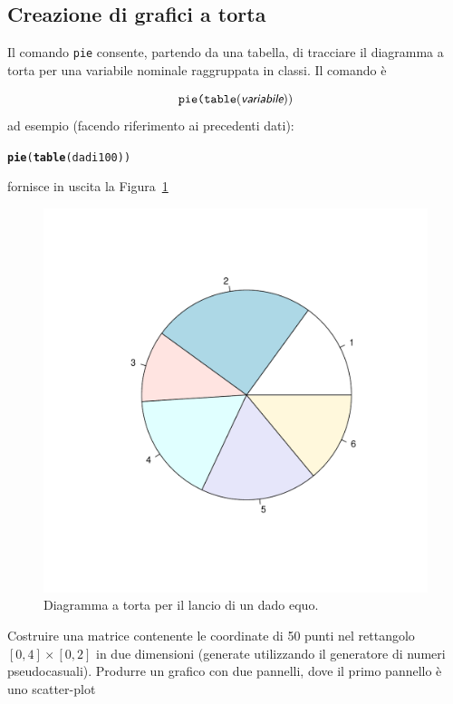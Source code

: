 \documentclass[onecolumn,12pt]{book}\usepackage[]{graphicx}\usepackage[]{color}
\makeatletter
\def\maxwidth{ %
  \ifdim\Gin@nat@width>\linewidth
    \linewidth
  \else
    \Gin@nat@width
  \fi
}
\newcommand{\hlstd}[1]{\textcolor[rgb]{0.345,0.345,0.345}{#1}}%
\newcommand{\hlkwd}[1]{\textcolor[rgb]{0.737,0.353,0.396}{\textbf{#1}}}%
\newenvironment{kframe}{%
 \def\at@end@of@kframe{}%
 \ifinner\ifhmode%
  \def\at@end@of@kframe{\end{minipage}}%
  \begin{minipage}{\columnwidth}%
 \fi\fi%
 \def\FrameCommand##1{\hskip\@totalleftmargin \hskip-\fboxsep
 \colorbox{shadecolor}{##1}\hskip-\fboxsep
     \hskip-\linewidth \hskip-\@totalleftmargin \hskip\columnwidth}%
 \MakeFramed {\advance\hsize-\width
   \@totalleftmargin\z@ \linewidth\hsize
   \@setminipage}}%
 {\par\unskip\endMakeFramed%
 \at@end@of@kframe}
\newenvironment{knitrout}{}{} %
\newcommand{\varia}[1]{\textsl{\textsf{#1}}}
\makeatother
\begin{document}
\subsection{Creazione di grafici a torta}

Il comando \texttt{pie} consente, partendo da una tabella, di tracciare il diagramma a torta per una variabile nominale raggruppata in classi. Il comando \`e

\begin{equation*}\texttt{pie(table}(\varia{variabile} ))
\end{equation*}
ad esempio (facendo riferimento ai precedenti dati):
\begin{knitrout}
\color{fgcolor}\begin{kframe}
\begin{alltt}
\hlkwd{pie}\hlstd{(}\hlkwd{table}\hlstd{(dadi100))}
\end{alltt}
\end{kframe}
\end{knitrout}
fornisce in uscita  la Figura~\ref{fig:pie}
\begin{figure}[htbp]
\begin{center}
\begin{knitrout}
\color{fgcolor}
\includegraphics[width=\maxwidth]{figure/unnamed-chunk-113-1} 

\end{knitrout}
\caption{Diagramma a torta per il lancio di un dado equo.}
\label{fig:pie}
\end{center}
\end{figure}
\begin{shaded}{Costruire una matrice contenente le coordinate di 50 punti nel rettangolo $[0,4]\times [0,2]$ in due dimensioni (generate utilizzando il generatore di numeri pseudocasuali). Produrre un grafico con due pannelli, dove il primo pannello \`e uno scatter-plot}
\end{shaded}
\end{document}

